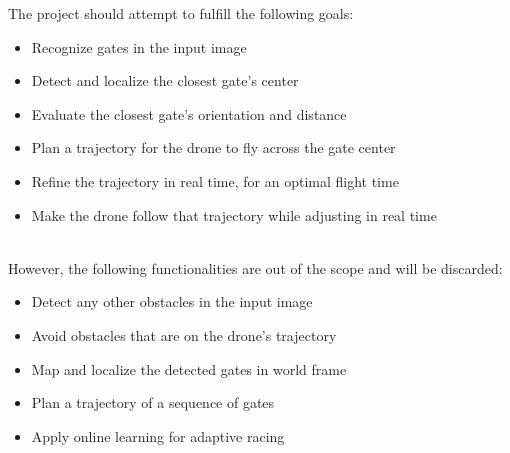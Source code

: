 The project should attempt to fulfill the following goals:

\begin{itemize}
	\item{Recognize gates in the input image}
	\item{Detect and localize the closest gate's center}
	\item{Evaluate the closest gate's orientation and distance}
	\item{Plan a trajectory for the drone to fly across the gate center}
	\item{Refine the trajectory in real time, for an optimal flight time}
	\item{Make the drone follow that trajectory while adjusting in real time}
\end{itemize}
~\\
However, the following functionalities are out of the scope and will be
discarded:

\begin{itemize}
	\item{Detect any other obstacles in the input image}
	\item{Avoid obstacles that are on the drone's trajectory}
	\item{Map and localize the detected gates in world frame}
	\item{Plan a trajectory of a sequence of gates}
	\item{Apply online learning for adaptive racing}
\end{itemize}


